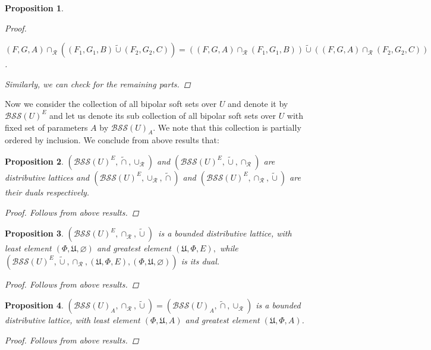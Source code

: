 \documentclass{amsart}
\theoremstyle{plain}
\newtheorem{proposition}{Proposition}
\numberwithin{equation}{section}
\begin{document}
\begin{proposition}
\begin{proof}
\begin{enumerate}
$(F,G,A)\cap _{\mathcal{R}}((F_{1},G_{1},B)\tilde{\cup}(F_{2},G_{2},C))=((F,G,A)\cap _{\mathcal{R}}(F_{1},G_{1},B))\tilde{\cup}((F,G,A)\cap _{\mathcal{R}}(F_{2},G_{2},C))$.
\end{enumerate}

Similarly, we can check for the remaining parts.
\end{proof}
\end{proposition}

Now we consider the collection of all bipolar soft sets over $U$ and denote
it by $\mathcal{BSS}(U)^{E}$ and let us denote its sub collection of all
bipolar soft sets over $U$ with fixed set of parameters $A$ by $\mathcal{BSS}(U)_{A}$. We note that this collection is partially ordered by inclusion. We
conclude from above results that:

\begin{proposition}
$(\mathcal{BSS}(U)^{E},\tilde{\cap},\cup _{\mathcal{R}})$ and $(\mathcal{BSS}(U)^{E},\tilde{\cup},\cap _{\mathcal{R}})$ are distributive lattices and $(\mathcal{BSS}(U)^{E},\cup _{\mathcal{R}},\tilde{\cap})$ and $(\mathcal{BSS}(U)^{E},\cap _{\mathcal{R}},\tilde{\cup})$ are their duals respectively.

\begin{proof}
Follows from above results.
\end{proof}
\end{proposition}

\begin{proposition}
$(\mathcal{BSS}(U)^{E},\cap _{\mathcal{R}},\tilde{\cup})$\ is a bounded
distributive lattice, with least element $(\Phi ,\mathfrak{U},\varnothing )$
and greatest element $(\mathfrak{U},\Phi ,E),$ while $(\mathcal{BSS}(U)^{E},\tilde{\cup},\cap _{\mathcal{R}},(\mathfrak{U},\Phi ,E),(\Phi ,\mathfrak{U},\varnothing ))$ is its dual.

\begin{proof}
Follows from above results.
\end{proof}
\end{proposition}

\begin{proposition}
$(\mathcal{BSS}(U)_{A},\cap _{\mathcal{R}},\tilde{\cup})=(\mathcal{BSS}(U)_{A},\tilde{\cap},\cup _{\mathcal{R}})$ is a bounded distributive
lattice, with least element $(\Phi ,\mathfrak{U},A)$ and greatest element $(\mathfrak{U},\Phi ,A)$.

\begin{proof}
Follows from above results.
\end{proof}
\end{proposition}
\end{document}
